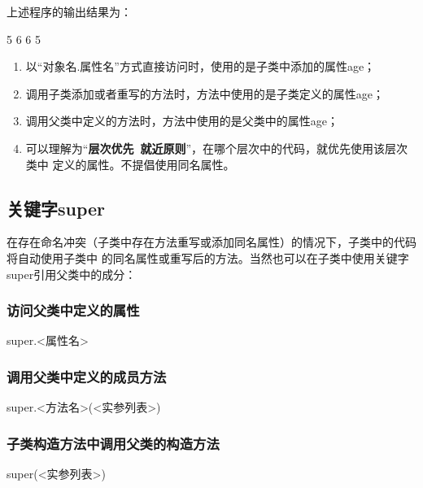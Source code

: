 上述程序的输出结果为：

\begin{stdoutCode}
  5
  6
  6
  5
\end{stdoutCode}


\begin{enumerate}
\item 以“对象名.属性名”方式直接访问时，使用的是子类中添加的属性age；
\item 调用子类添加或者重写的方法时，方法中使用的是子类定义的属性age；
\item 调用父类中定义的方法时，方法中使用的是父类中的属性age；
\item 可以理解为“{\bf\Blue 层次优先~就近原则}”，在哪个层次中的代码，就优先使用该层次类中
  定义的属性。不提倡使用同名属性。
\end{enumerate}

\subsection{关键字super} 

在存在命名冲突（子类中存在方法重写或添加同名属性）的情况下，子类中的代码将自动使用子类中
的同名属性或重写后的方法。当然也可以在子类中{\Red 使用关键字super引用父类中的成分}：

\subsubsection{访问父类中定义的属性}

\begin{javaCode}
  super.<属性名>  
\end{javaCode}

\subsubsection{调用父类中定义的成员方法}

\begin{javaCode}
  super.<方法名>(<实参列表>)
\end{javaCode}

\subsubsection{子类构造方法中调用父类的构造方法}

\begin{javaCode}
  super(<实参列表>)  
\end{javaCode}

